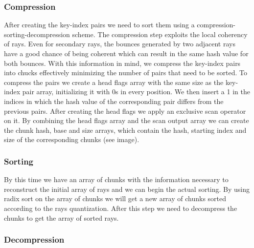 \documentclass{llncs}
\begin{document}

%
\subsubsection{Compression}
%

After creating the key-index pairs we need to sort them using a compression-sorting-decompression scheme. The compression step exploits the local coherency of rays. Even for secondary rays, the bounces generated by two adjacent rays have a good chance of being coherent which can result  in the same hash value for both bounces. With this information in mind, we compress the key-index pairs into chucks effectively minimizing the number of pairs that need to be sorted. To compress the pairs we create a head flags array with the same size as the key-index pair array, initializing it with 0s in every position. We then insert a 1 in the indices in which the hash value of the corresponding pair differs from the previous pairs. After creating the head flags we apply an exclusive scan operator on it. By combining the head flags array and the scan output array we can create the chunk hash, base and size arrays, which contain the hash, starting index and size of the corresponding chunks (see image).


%
\subsubsection{Sorting}
%

By this time we have an array of chunks with the information necessary to reconstruct the initial array of rays and we can begin the actual sorting. By using radix sort \cite{Satish09} on the array of chunks we will get a new array of chunks sorted according to the rays quantization. After this step we need to decompress the chunks to get the array of sorted rays.


%
\subsubsection{Decompression}
%
\end{document}
